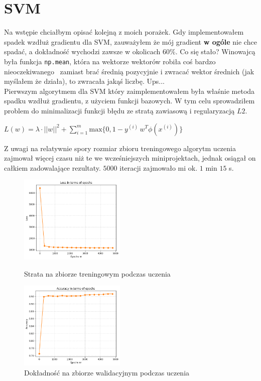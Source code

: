 \documentclass[polish,12pt,a4paper]{extarticle}
\begin{document}
\section*{SVM}
Na wstępie chciałbym opisać kolejną z moich porażek. Gdy implementowałem spadek wzdłuż gradientu dla SVM, zauważyłem że mój gradient \textbf{w ogóle} nie chce spadać, a dokładność wychodzi zawsze w okolicach $60\%$. Co się stało? Winowajcą była funkcja \texttt{np.mean}, która na wektorze wektorów robiła coś bardzo nieoczekiwanego \textendash\, zamiast brać średnią pozycyjnie i zwracać wektor średnich (jak myślałem że działa), to zwracała jakąś liczbę. Ups...\smallskip \\
Pierwszym algorytmem dla SVM który zaimplementowałem była właśnie metoda spadku wzdłuż gradientu, z użyciem funkcji bazowych. W tym celu sprowadziłem problem do minimalizacji funkcji błędu ze stratą zawiasową i regularyzacją $L2$.
\begin{center}
    $L(w) = \lambda \cdot ||w||^2 + \sum_{i=1}^m \mathrm{max}\{0, 1 - y^{(i)} \, w^T \phi(x^{(i)}) \}$
\end{center} Z uwagi na relatywnie spory rozmiar zbioru treningowego algorytm uczenia zajmował więcej czasu niż te we wcześniejszych miniprojektach, jednak osiągał on całkiem zadowalające rezultaty. $5000$ iteracji zajmowało mi ok. $1$ min $15$ s.
\begin{figure}[h!]
    \centering
    \includegraphics[width=0.45\textwidth]{img/epoch_loss.png}
    \caption{Strata na zbiorze treningowym podczas uczenia}
    \includegraphics[width=0.45\textwidth]{img/epoch_accuracy.png}
    \caption{Dokładność na zbiorze walidacyjnym podczas uczenia}

\end{figure} \FloatBarrier \\
\end{document}
